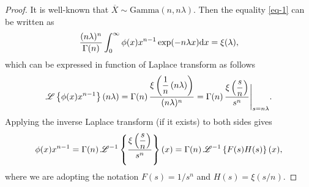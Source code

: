 \documentclass[12pt]{article}
\theoremstyle{definition}
\begin{document}
\begin{proof}
	It is well-known that  $\overline{X}\sim\text{Gamma}(n,n\lambda)$. Then the equality \eqref{eq-1} can be written as
	\begin{align*}
		{(n\lambda)^n\over \Gamma(n)}
		\int_{0}^{\infty}
		\phi(x)
		x^{n-1}
		\exp(-n\lambda x)
		{\rm d}x
		=
		\xi(\lambda),
	\end{align*}
	which can be expressed in function of Laplace transform as follows
	\begin{align*}
		\mathscr{L}\left\{	\phi(x)
		x^{n-1}\right\}(n\lambda)
		=
		\Gamma(n)\,
		{\displaystyle \xi\left({1\over n} \, (n\lambda)\right)\over (n\lambda)^n}
		=
		\Gamma(n)\,
		{\displaystyle \xi\left({s\over n}\right)\over s^n}
		\Bigg\vert_{s=n\lambda}.
	\end{align*}
	Applying the inverse Laplace transform (if it exists) to both sides gives
	\begin{align}\label{main-identit-0}
		\phi(x)
		x^{n-1}
		=
		\Gamma(n)\,
		\mathscr{L}^{-1}\left\{	
		{\displaystyle \xi\left({s\over n}\right)\over s^n}
		\right\}
		(x)
		=
		\Gamma(n)\,
		\mathscr{L}^{-1}\left\{	
		F(s)H(s)
		\right\}
		(x),
	\end{align}	
	where we are adopting the notation $F(s)=1/s^n$ and $H(s)=\xi\left({s/n}\right)$. 
	

\end{proof}
\end{document}
